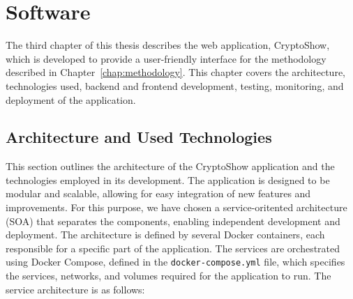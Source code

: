 \chapter{Software}
\label{chap:software}

The third chapter of this thesis describes the web application, CryptoShow, which is developed to provide a user-friendly interface for the methodology described in Chapter~\ref{chap:methodology}. This chapter covers the architecture, technologies used, backend and frontend development, testing, monitoring, and deployment of the application.

\section{Architecture and Used Technologies}
\label{sec:architecture-technologies}

This section outlines the architecture of the CryptoShow application and the technologies employed in its development. The application is designed to be modular and scalable, allowing for easy integration of new features and improvements. For this purpose, we have chosen a service-oritented architecture (SOA) that separates the components, enabling independent development and deployment. The architecture is defined by several Docker containers, each responsible for a specific part of the application. The services are orchestrated using Docker Compose, defined in the \texttt{docker-compose.yml} file, which specifies the services, networks, and volumes required for the application to run. The service architecture is as follows:

